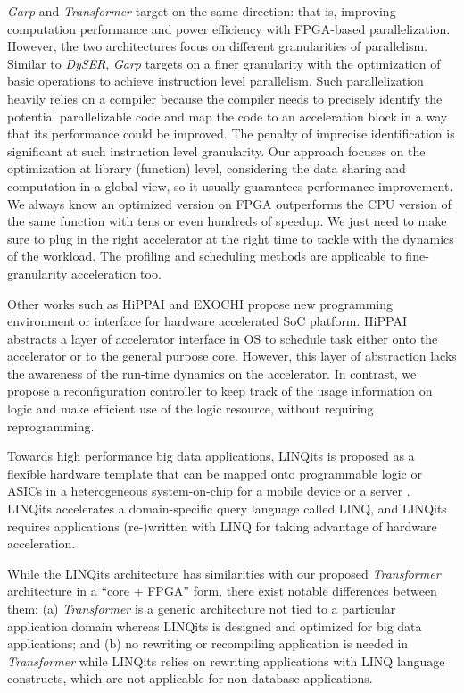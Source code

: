{\em Garp} \cite{Garp:1997,Garp:2000} and {\em Transformer} target on
the same direction: that is, improving computation performance and power
efficiency with FPGA-based parallelization. However, the two
architectures focus on different granularities of parallelism. Similar
to {\em DySER}, {\em Garp} targets on a finer granularity with the
optimization of basic operations to achieve instruction level
parallelism. Such parallelization heavily relies on a compiler because the compiler needs to
precisely identify the potential parallelizable code and map the code
to an acceleration block in a way that its performance could be
improved. The penalty of imprecise identification is significant at such instruction level granularity.
Our approach focuses on the optimization at library (function) level,
considering the data sharing and computation in a global
view, so it usually guarantees performance improvement. We always know
an optimized version on FPGA outperforms the CPU version of the same
function with tens or even hundreds of speedup. We just need to make
sure to plug in the right accelerator at the right time to tackle with
the dynamics of the workload. The profiling and scheduling methods are applicable to fine-granularity acceleration too.

Other works such as HiPPAI \cite{Stillwell:2009if} and EXOCHI
\cite{Wang:2007bc} propose new programming environment or interface
for hardware accelerated SoC platform. HiPPAI abstracts a layer of
accelerator interface in OS to schedule task either onto the
accelerator or to the general purpose core. However, this layer of
abstraction lacks the awareness of the run-time dynamics on the
accelerator. In contrast, we propose a reconfiguration controller to
keep track of the usage information on logic and make 
efficient use of the logic resource, without requiring reprogramming. 

Towards high performance big data applications, LINQits is proposed as
a flexible hardware template that can be mapped onto programmable
logic or ASICs in a heterogeneous system-on-chip for a mobile device
or a server \cite{Chung:2013:LBD:2485922.2485945}. LINQits accelerates a domain-specific query
language called LINQ, and LINQits requires applications (re-)written with
LINQ for taking advantage of hardware acceleration. 

While the LINQits architecture has similarities with our proposed {\em
  Transformer} architecture in a ``core + FPGA'' form, there exist
notable differences between them: (a) {\em Transformer} is a
generic architecture not tied to a particular application domain
whereas LINQits is designed and optimized for big data applications; 
and (b) no rewriting or recompiling application is needed in {\em Transformer} while
LINQits relies on rewriting applications with LINQ language
constructs, which are not applicable for non-database applications.

